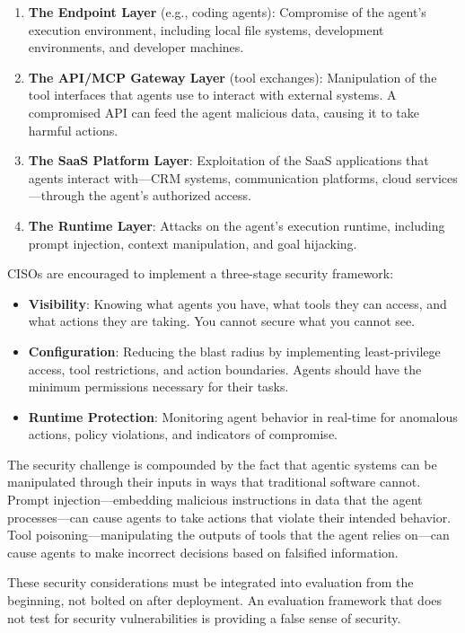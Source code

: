 \begin{enumerate}
    \item \textbf{The Endpoint Layer} (e.g., coding agents): Compromise of the agent's execution environment, including local file systems, development environments, and developer machines.
    \item \textbf{The API/MCP Gateway Layer} (tool exchanges): Manipulation of the tool interfaces that agents use to interact with external systems. A compromised API can feed the agent malicious data, causing it to take harmful actions.
    \item \textbf{The SaaS Platform Layer}: Exploitation of the SaaS applications that agents interact with---CRM systems, communication platforms, cloud services---through the agent's authorized access.
    \item \textbf{The Runtime Layer}: Attacks on the agent's execution runtime, including prompt injection, context manipulation, and goal hijacking.
\end{enumerate}

CISOs are encouraged to implement a three-stage security framework:

\begin{itemize}
    \item \textbf{Visibility}: Knowing what agents you have, what tools they can access, and what actions they are taking. You cannot secure what you cannot see.
    \item \textbf{Configuration}: Reducing the blast radius by implementing least-privilege access, tool restrictions, and action boundaries. Agents should have the minimum permissions necessary for their tasks.
    \item \textbf{Runtime Protection}: Monitoring agent behavior in real-time for anomalous actions, policy violations, and indicators of compromise.
\end{itemize}

The security challenge is compounded by the fact that agentic systems can be manipulated through their inputs in ways that traditional software cannot. Prompt injection---embedding malicious instructions in data that the agent processes---can cause agents to take actions that violate their intended behavior. Tool poisoning---manipulating the outputs of tools that the agent relies on---can cause agents to make incorrect decisions based on falsified information.

These security considerations must be integrated into evaluation from the beginning, not bolted on after deployment. An evaluation framework that does not test for security vulnerabilities is providing a false sense of security.